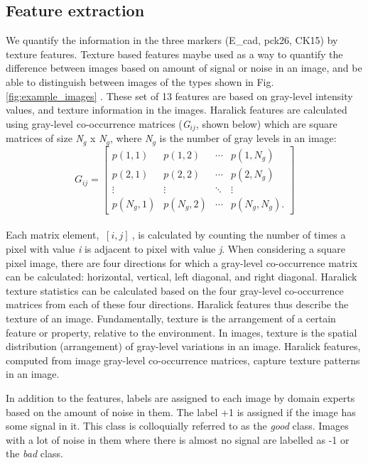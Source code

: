 \subsection{Feature extraction}

We quantify the information in the three markers (E\_cad, pck26, CK15) by texture features. Texture based features maybe used as a way to quantify the difference between images based on amount of signal or noise in an image, and be able to distinguish between images of the types shown in Fig. \ref{fig:example_images} .  These set of 13 features are based on gray-level intensity values, and texture information \cite{haralick1979statistical, haralick1973textural} in the images. 
Haralick features \cite{Haralick1973} are calculated using gray-level co-occurrence matrices (\textit{G$_{ij}$}, shown below) which are square matrices of size \textit{N$_g$} x \textit{N$_g$}, where \textit{N$_g$} is the number of gray levels in an image:
\\
\begin{equation}
G_{ij}=
  \begin{bmatrix}
    p(1,1) & p(1,2) & \cdots       & p(1,N_{g}) \\
    p(2,1) & p(2,2) &  \cdots      & p(2,N_{g}) \\
     \vdots &  \vdots &  \ddots    &  \vdots          \\
    p(N_{g},1)  & p(N_{g},2) & \cdots & p(N_{g},N_{g}). 
  \end{bmatrix}
\end{equation}
\\
Each matrix element, $ \ [i,j]\ $, is calculated by counting the number of times a pixel with value \textit{i} is adjacent to pixel with value \textit{j}.  When considering a square pixel image, there are four directions for which a gray-level co-occurrence matrix can be calculated: horizontal, vertical, left diagonal, and right diagonal.  Haralick texture statistics can be calculated based on the four gray-level co-occurrence matrices from each of these four directions. Haralick features thus describe the texture of an image. Fundamentally, texture is the arrangement of a certain feature or property, relative to the environment. In images, texture is the spatial distribution (arrangement) of gray-level variations in an image. Haralick features, computed from image gray-level co-occurrence matrices, capture texture patterns in an image. 

In addition to the features, labels are assigned to each image by domain experts based on the amount of noise in them. The label +1 is assigned if the image has some signal in it. This class is colloquially referred to as the \textit{good} class.  Images with a lot of noise in them where there is almost no signal are labelled as -1 or the \textit{bad} class.

